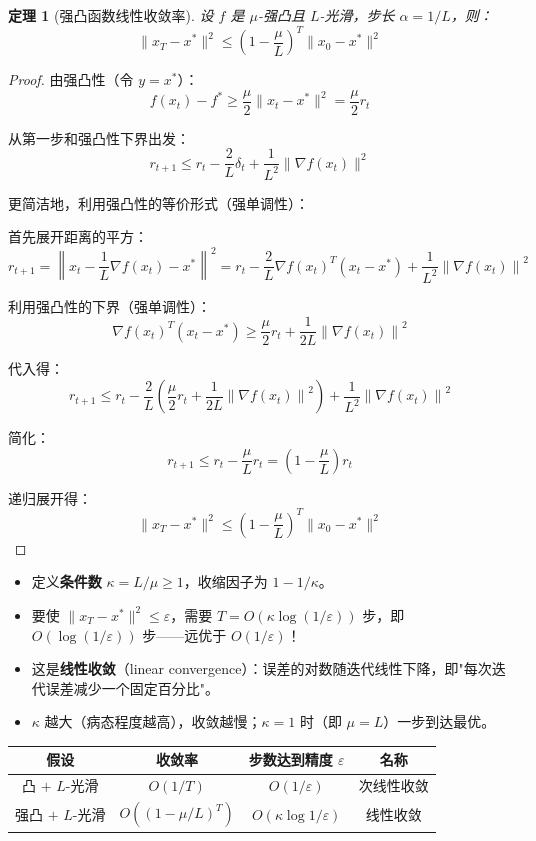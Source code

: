 \documentclass[10pt]{article}
\numberwithin{equation}{section}
\theoremstyle{plain}
\newtheorem{theorem}{定理}[section]
\theoremstyle{definition}
\theoremstyle{remark}
\newcommand{\norm}[1]{\lVert #1 \rVert}
\begin{document}
\begin{theorem}[强凸函数线性收敛率]
	设 $f$ 是 $\mu$-强凸且 $L$-光滑，步长 $\alpha = 1/L$，则：
	\[\norm{x_T - x^*}^2 \leq \left(1 - \frac{\mu}{L}\right)^T \norm{x_0 - x^*}^2\]
\end{theorem}

\begin{proof}
	由强凸性（令 $y = x^*$）：
	\[f(x_t) - f^* \geq \frac{\mu}{2}\norm{x_t - x^*}^2 = \frac{\mu}{2} r_t\]

	从第一步和强凸性下界出发：
	\[r_{t+1} \leq r_t - \frac{2}{L}\delta_t + \frac{1}{L^2}\norm{\nabla f(x_t)}^2\]

	更简洁地，利用强凸性的等价形式（强单调性）：

	首先展开距离的平方：
	\[r_{t+1} = \left\|x_t - \frac{1}{L}\nabla f(x_t) - x^*\right\|^2 = r_t - \frac{2}{L}\nabla f(x_t)^T(x_t - x^*) + \frac{1}{L^2}\left\|\nabla f(x_t)\right\|^2\]

	利用强凸性的下界（强单调性）：
	\[\nabla f(x_t)^T(x_t - x^*) \geq \frac{\mu}{2}r_t + \frac{1}{2L}\left\|\nabla f(x_t)\right\|^2\]

	代入得：
	\[r_{t+1} \leq r_t - \frac{2}{L}\left(\frac{\mu}{2}r_t + \frac{1}{2L}\left\|\nabla f(x_t)\right\|^2\right) + \frac{1}{L^2}\left\|\nabla f(x_t)\right\|^2\]

	简化：
	\[r_{t+1} \leq r_t - \frac{\mu}{L} r_t = \left(1 - \frac{\mu}{L}\right) r_t\]

	递归展开得：
	\[\norm{x_T - x^*}^2 \leq \left(1 - \frac{\mu}{L}\right)^T \norm{x_0 - x^*}^2\]
\end{proof}

\begin{RemarkBox}[线性收敛率的含义]
	\begin{itemize}
		\item 定义\textbf{条件数} $\kappa = L/\mu \geq 1$，收缩因子为 $1 - 1/\kappa$。
		\item 要使 $\norm{x_T - x^*}^2 \leq \varepsilon$，需要 $T = O(\kappa \log(1/\varepsilon))$ 步，即 $O(\log(1/\varepsilon))$ 步——远优于 $O(1/\varepsilon)$！
		\item 这是\textbf{线性收敛}（linear convergence）：误差的对数随迭代线性下降，即"每次迭代误差减少一个固定百分比"。
		\item $\kappa$ 越大（病态程度越高），收敛越慢；$\kappa = 1$ 时（即 $\mu = L$）一步到达最优。
	\end{itemize}
\end{RemarkBox}

\begin{center}
	\begin{tabular}{c|c|c|c}
		假设            & 收敛率              & 步数达到精度 $\varepsilon$           & 名称    \\
		\hline
		凸 $+$ $L$-光滑  & $O(1/T)$         & $O(1/\varepsilon)$             & 次线性收敛 \\
		强凸 $+$ $L$-光滑 & $O((1-\mu/L)^T)$ & $O(\kappa \log 1/\varepsilon)$ & 线性收敛  \\
	\end{tabular}
\end{center}
\end{document}
